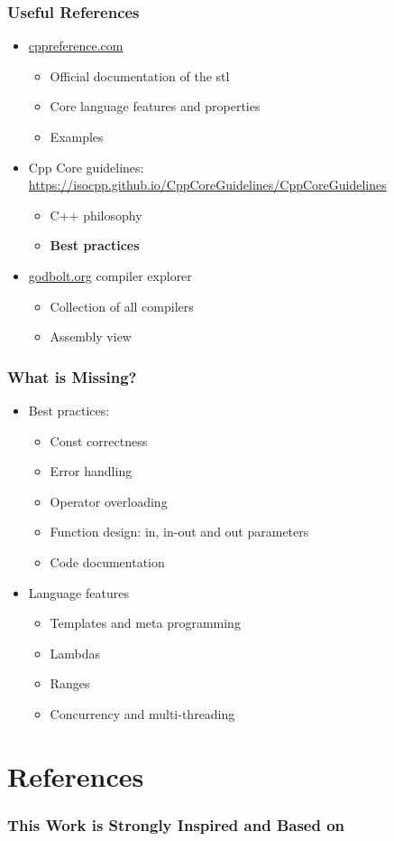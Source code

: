 \documentclass[usenames,dvipsnames,svgnames,table,aspectratio=169]{beamer}
\begin{document}
\begin{frame}
    \frametitle{Useful References}
    \begin{itemize}
        \item<+-> \url{cppreference.com}
        \begin{itemize}
            \item<+-> Official documentation of the stl
            \item<+-> Core language features and properties
            \item<+-> Examples
        \end{itemize}
        \item<+-> Cpp Core guidelines: \url{https://isocpp.github.io/CppCoreGuidelines/CppCoreGuidelines}
        \begin{itemize}
            \item<+-> C++ philosophy
            \item<+-> \textbf{Best practices}
        \end{itemize}
        \item<+-> \url{godbolt.org} compiler explorer
        \begin{itemize}
            \item<+-> Collection of all compilers
            \item<+-> Assembly view
        \end{itemize}
    \end{itemize}
\end{frame}

\begin{frame}
    \frametitle{What is Missing?}
    \begin{itemize}
        \item<+-> Best practices:
        \begin{itemize}
            \item<+-> Const correctness
            \item<+-> Error handling
            \item<+-> Operator overloading
            \item<+-> Function design: in, in-out and out parameters
            \item<+-> Code documentation
        \end{itemize}
        \item<+-> Language features
        \begin{itemize}
            \item<+-> Templates and meta programming
            \item<+-> Lambdas
            \item<+-> Ranges
            \item<+-> Concurrency and multi-threading
        \end{itemize}
    \end{itemize}

    

\end{frame}

\section*{References}
\begin{frame}
  \frametitle{This Work is Strongly Inspired and Based on}
  \printbibliography
\end{frame}
\end{document}
